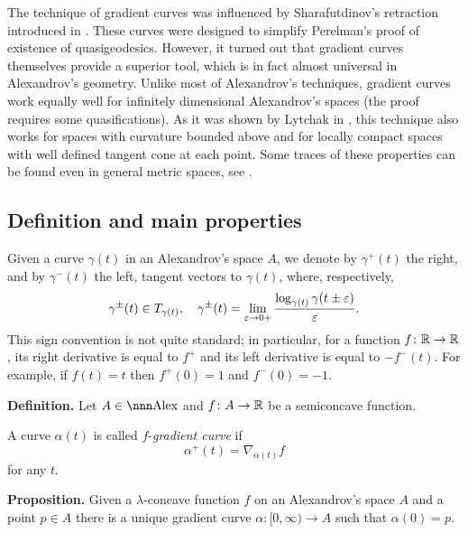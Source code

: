 \documentclass{article}
\begin{document}
The technique of gradient curves was influenced by 
Sharafutdinov's retraction introduced in \cite{sharafutdinov}. 
These curves were designed to simplify Perelman's proof of
existence of quasigeodesics. 
However, it turned out that gradient curves themselves
provide a superior tool, which is in fact almost universal in Alexandrov's
geometry.
Unlike most of Alexandrov's techniques, gradient curves work equally well for
infinitely dimensional Alexandrov's spaces (the proof requires some quasifications). 
As it was shown by Lytchak in \cite{lytchak:open-map},
this technique also works for spaces with curvature bounded above and for locally compact
spaces with well defined tangent cone at each point. 
Some traces of these
properties can be found even in general metric spaces, 
see \cite{grad-flow-book}.











\subsection{Definition and main properties}\label{def-grad-curv}

Given a curve $\gamma(t)$ in an Alexandrov's space $A$, we denote by $\gamma^+(t)$ 
the right, and by 
$\gamma^-(t)$ the left, tangent vectors to  $\gamma(t)$, where, respectively,
$$\gamma^\pm(t)\in T_{\gamma(t)},\ \ \ 
\gamma^\pm(t)
=
\lim_{\eps\to 0+}
\frac{\log_{\gamma(t)}\gamma(t\pm\eps)}{\eps}.$$ 
This sign convention is not quite standard; 
in particular, for a function
$f\:\RR\z\to\RR$,  its right derivative is equal to $f^+$ and  its left derivative is equal to $-f^-(t)$.
For example, if $f(t)=t$ then $f^+(0)= 1$ and $f^-(0)= -1$.

\begin{thm}{\bf Definition.} Let $A\in\Alex$ and $f\colon A\to \mathbb{R}$ be a semiconcave
function. 

A curve $\alpha(t)$ is called $f$-\emph{gradient curve} if 
$$\alpha^+(t)=\nabla_{\alpha(t)}f$$
for any $t$.
\end{thm}

\begin{thm}{\bf Proposition.}\label{prop:gradlip} Given a $\lambda$-concave
function $f$ on an Alexandrov's space $A$ and a point $p\in A$ there is a unique
gradient curve $\alpha\colon [0,\infty) \rightarrow A$ such that $\alpha(0)=p$. 
\end{thm} 
\end{document}
